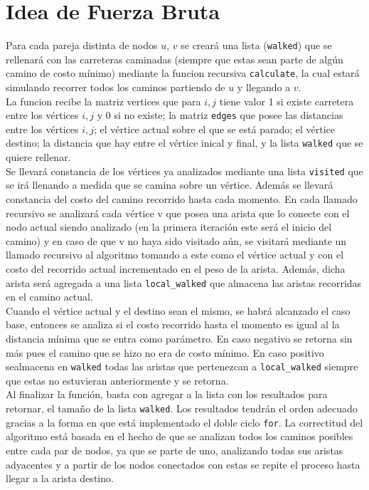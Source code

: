 \documentclass[a4paper,12pt,twocolumn]{article}
\begin{document}
	\section{Idea de Fuerza Bruta}

		Para cada pareja distinta de nodos $u$, $v$ se creará una lista (\texttt{\ttfamily walked}) que se rellenará con las carreteras caminadas (siempre que estas sean parte de algún camino de costo mínimo) mediante la funcion recursiva \texttt{\ttfamily calculate}, la cual estará simulando recorrer todos los caminos partiendo de $u$ y llegando a $v$. \\
		
		La funcion recibe la matriz vertices que para $i, j$ tiene valor 1 si existe carretera entre los vértices $i, j$ y 0 si no existe; la matriz \texttt{\ttfamily edges} que posee las distancias entre los vértices $i, j$; el vértice actual sobre el que se está parado; el vértice destino; la distancia que hay entre el vértice inical y final, y la lista \texttt{\ttfamily walked} que se quiere rellenar.\\
		
		Se llevará constancia de los vértices ya analizados mediante una lista \texttt{\ttfamily visited} que se irá llenando a medida que se camina sobre un vértice. Además se llevará constancia del costo del camino recorrido hasta cada momento. En cada llamado recursivo se analizará cada vértice v que posea una arista que lo conecte con el nodo actual siendo analizado (en la primera iteración este será el inicio del camino) y en caso de que v no haya sido visitado aún, se visitará mediante un llamado recursivo al algoritmo tomando a este como el vértice actual y con el costo del recorrido actual incrementado en el peso de la arista. Además, dicha arista será agregada a una lista \texttt{\ttfamily local\_walked} que almacena las aristas recorridas en el camino actual.\\
		
		Cuando el vértice actual y el destino sean el mismo, se habrá alcanzado el caso base, entonces se analiza si el costo recorrido hasta el momento es igual al la distancia mínima que se entra como parámetro. En caso negativo se retorna sin más pues el camino que se hizo no era de costo mínimo. En caso positivo sealmacena en \texttt{\ttfamily walked} todas las aristas que pertenezcan a \texttt{\ttfamily local\_walked} siempre que estas no estuvieran anteriormente y se retorna.\\
		
		Al finalizar la función, basta con agregar a la lista con los resultados para retornar, el tamaño de la lista \texttt{\ttfamily walked}. Los resultados tendrán el orden adecuado gracias a la forma en que está implementado el doble ciclo \texttt{\ttfamily for}.
		La correctitud del algoritmo está basada en el hecho de que se analizan todos los caminos posibles entre cada par de nodos, ya que se parte de uno, analizando todas sus aristas adyacentes y a partir de los nodos conectados con estas se repite el proceso hasta llegar a la arista destino.\\
		
\end{document}
